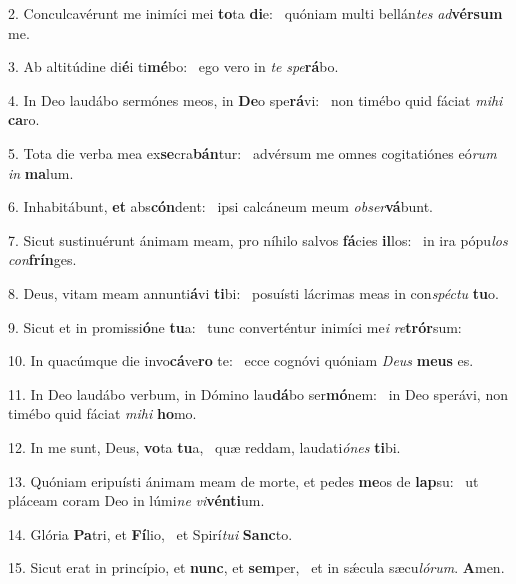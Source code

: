 2. Conculcavérunt me inimíci mei \textbf{to}ta \textbf{di}e: \ast\  quóniam multi bellán\textit{tes} \textit{ad}\textbf{vér}\textbf{sum} me.\

3. Ab altitúdine di\textbf{é}i ti\textbf{mé}bo: \ast\  ego vero in \textit{te} \textit{spe}\textbf{rá}bo.\

4. In Deo laudábo sermónes meos, in \textbf{De}o spe\textbf{rá}vi: \ast\  non timébo quid fáciat \textit{mi}\textit{hi} \textbf{ca}ro.\

5. Tota die verba mea ex\textbf{se}cra\textbf{bán}tur: \ast\  advérsum me omnes cogitatiónes eó\textit{rum} \textit{in} \textbf{ma}lum.\

6. Inhabitábunt, \textbf{et} abs\textbf{cón}dent: \ast\  ipsi calcáneum meum \textit{ob}\textit{ser}\textbf{vá}bunt.\

7. Sicut sustinuérunt ánimam meam, pro níhilo salvos \textbf{fá}cies \textbf{il}los: \ast\  in ira pópu\textit{los} \textit{con}\textbf{frín}ges.\

8. Deus, vitam meam annunti\textbf{á}vi \textbf{ti}bi: \ast\  posuísti lácrimas meas in con\textit{spéc}\textit{tu} \textbf{tu}o.\

9. Sicut et in promissi\textbf{ó}ne \textbf{tu}a: \ast\  tunc converténtur inimíci me\textit{i} \textit{re}\textbf{trór}sum:\

10. In quacúmque die invo\textbf{cá}ve\textbf{ro} te: \ast\  ecce cognóvi quóniam \textit{De}\textit{us} \textbf{me}\textbf{us} es.\

11. In Deo laudábo verbum, in Dómino lau\textbf{dá}bo ser\textbf{mó}nem: \ast\  in Deo sperávi, non timébo quid fáciat \textit{mi}\textit{hi} \textbf{ho}mo.\

12. In me sunt, Deus, \textbf{vo}ta \textbf{tu}a, \ast\  quæ reddam, laudati\textit{ó}\textit{nes} \textbf{ti}bi.\

13. Quóniam eripuísti ánimam meam de morte, et pedes \textbf{me}os de \textbf{lap}su: \ast\  ut pláceam coram Deo in lúmi\textit{ne} \textit{vi}\textbf{vén}\textbf{ti}um.\

14. Glória \textbf{Pa}tri, et \textbf{Fí}lio, \ast\  et Spirí\textit{tu}\textit{i} \textbf{Sanc}to.\

15. Sicut erat in princípio, et \textbf{nunc}, et \textbf{sem}per, \ast\  et in sǽcula sæcu\textit{ló}\textit{rum}. \textbf{A}men.\

